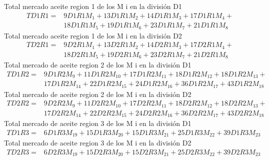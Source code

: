Total mercado aceite region 1 de los M i en la división D1
\begin{equation*}
\begin{split}
  TD1R1 = &  9 D1R1M_1 + 13 D1R1M_2 + 14 D1R1M_3 + 17 D1R1M_4 + \\ 
  		  & 18 D1R1M_5 + 19 D1R1M_6 + 23 D1R1M_7 + 21 D1R1M_8
\end{split}
\end{equation*}
Total mercado aceite region 1 de los M i en la división D2
\begin{equation*}
\begin{split}
  TD2R1 = &  9 D2R1M_1 + 13 D2R1M_2 + 14 D2R1M_3 + 17 D2R1M_4 + \\ 
  		  & 18 D2R1M_5 + 19 D2R1M_6 + 23 D2R1M_7 + 21 D2R1M_8 
\end{split}
\end{equation*}
Total mercado de aceite region 2 de los M i en la división D1
\begin{equation*}
\begin{split}
  TD1R2 = &  9 D1R2M_9 + 11 D1R2M_{10} + 17 D1R2M_{11} + 18 D1R2M_{12} + 18 D1R2M_{13} +\\ 
  		  & 17 D1R2M_{14} + 22 D1R2M_{15} + 24 D1R2M_{16} + 36 D1R2M_{17} + 43 D1R2M_{18}
\end{split}
\end{equation*}
Total mercado de aceite region 2 de los M i en la división D2
\begin{equation*}
\begin{split}
  TD2R2 = &  9 D2R2M_9 + 11 D2R2M_{10} + 17 D2R2M_{11} + 18 D2R2M_{12} + 18 D2R2M_{13} +\\ 
  		  & 17 D2R2M_{14} + 22 D2R2M_{15} + 24  D2R2M_{16} + 36 D2R2M_{17} + 43 D2R2M_{18}
\end{split}
\end{equation*}
Total mercado de aceite region 3 de los M i en la división D1
\begin{equation*}
\begin{split}
  TD1R3 = & 6 D1R3M_{19} + 15 D1R3M_{20} + 15 D1R3M_{21} + 25 D1R3M_{22} + 39 D1R3M_{23} 
\end{split}
\end{equation*}
Total mercado de aceite region 3 de los M i en la división D2
\begin{equation*}
\begin{split}
  TD2R3 = & 6 D2R3M_{19} + 15 D2R3M_{20} + 15 D2R3M_{21} + 25 D2R3M_{22} + 39 D2R3M_{23} 
\end{split}
\end{equation*}
